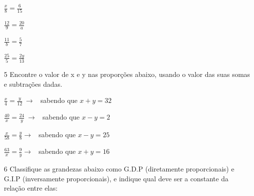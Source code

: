 \begin{escolha}[itemsep=0pt]
\item $\frac{x}{8} = \frac{6}{15}$ \  
\item $\frac{12}{9} = \frac{20}{a}$ \  
\item $\frac{11}{b} = \frac{5}{7}$ \  
\item $\frac{25}{5} = \frac{2y}{13}$ \  
\end{escolha}

\num{5} Encontre o valor de x e y nas proporções abaixo, usando o valor das
suas somas e subtrações dadas.

\begin{escolha}[itemsep=0pt]

\item $\frac{x}{4} = \frac{y}{12}\  \rightarrow$ \ sabendo que $x + y = 32$ 


\item $\frac{40}{x} = \frac{24}{y}\  \rightarrow$ \ sabendo que $x - y = 2$ 


\item $\frac{x}{58} = \frac{y}{8} \rightarrow$ \ sabendo que $x - y = 25$ 


\item $\frac{63}{x} = \frac{9}{y} \rightarrow$ \ sabendo que $x + y = 16$ 


\end{escolha}

\num{6} Classifique as grandezas abaixo como G.D.P (diretamente
proporcionais) e G.I.P (inversamente proporcionais), e indique qual deve
ser a constante da relação entre elas:

